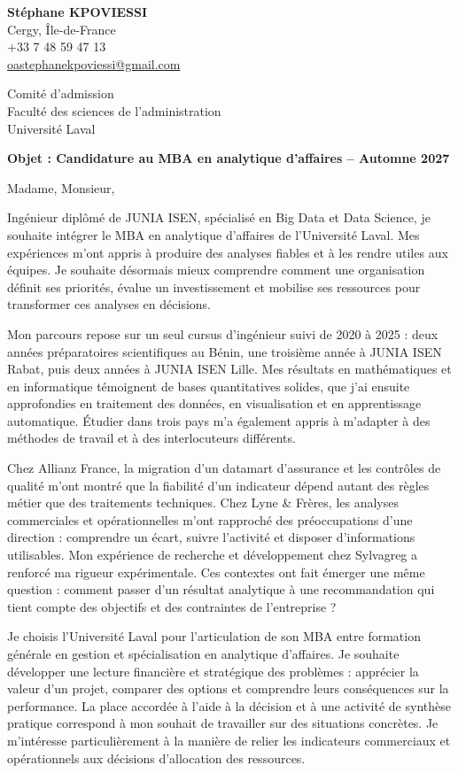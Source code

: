 \documentclass[12pt,a4paper]{article}
\begin{document}
\thispagestyle{empty}
\textbf{Stéphane KPOVIESSI}\\
{\small Cergy, Île-de-France\\
+33 7 48 59 47 13\\
\href{mailto:oastephanekpoviessi@gmail.com}{oastephanekpoviessi@gmail.com}}

\vspace{0.4em}
Comité d'admission\\
Faculté des sciences de l'administration\\
Université Laval

\vspace{0.3em}
\textbf{Objet : Candidature au MBA en analytique d'affaires -- Automne 2027}

Madame, Monsieur,

Ingénieur diplômé de JUNIA ISEN, spécialisé en Big Data et Data Science, je souhaite intégrer le MBA en analytique d'affaires de l'Université Laval. Mes expériences m'ont appris à produire des analyses fiables et à les rendre utiles aux équipes. Je souhaite désormais mieux comprendre comment une organisation définit ses priorités, évalue un investissement et mobilise ses ressources pour transformer ces analyses en décisions.

Mon parcours repose sur un seul cursus d'ingénieur suivi de 2020 à 2025 : deux années préparatoires scientifiques au Bénin, une troisième année à JUNIA ISEN Rabat, puis deux années à JUNIA ISEN Lille. Mes résultats en mathématiques et en informatique témoignent de bases quantitatives solides, que j'ai ensuite approfondies en traitement des données, en visualisation et en apprentissage automatique. Étudier dans trois pays m'a également appris à m'adapter à des méthodes de travail et à des interlocuteurs différents.

Chez Allianz France, la migration d'un datamart d'assurance et les contrôles de qualité m'ont montré que la fiabilité d'un indicateur dépend autant des règles métier que des traitements techniques. Chez Lyne \& Frères, les analyses commerciales et opérationnelles m'ont rapproché des préoccupations d'une direction : comprendre un écart, suivre l'activité et disposer d'informations utilisables. Mon expérience de recherche et développement chez Sylvagreg a renforcé ma rigueur expérimentale. Ces contextes ont fait émerger une même question : comment passer d'un résultat analytique à une recommandation qui tient compte des objectifs et des contraintes de l'entreprise ?

\newpage
Je choisis l'Université Laval pour l'articulation de son MBA entre formation générale en gestion et spécialisation en analytique d'affaires. Je souhaite développer une lecture financière et stratégique des problèmes : apprécier la valeur d'un projet, comparer des options et comprendre leurs conséquences sur la performance. La place accordée à l'aide à la décision et à une activité de synthèse pratique correspond à mon souhait de travailler sur des situations concrètes. Je m'intéresse particulièrement à la manière de relier les indicateurs commerciaux et opérationnels aux décisions d'allocation des ressources.
\end{document}
